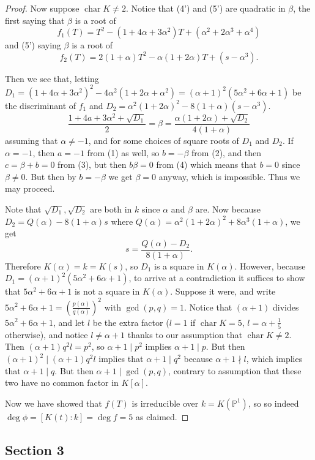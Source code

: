\documentclass{article}
\newcommand{\topic}[1]{%
  \phantomsection
  \subsection*{#1}%
  \addcontentsline{toc}{subsection}{#1}%
}
\theoremstyle{customplain}
\theoremstyle{customdef}
\renewcommand{\P}{\mathbb{P}}
\DeclareMathOperator{\Char}{\mathrm{char}}
\theoremstyle{definition} %
\begin{document}
\begin{proof}
Now suppose $\Char K \ne 2.$ Notice that (4') and (5') are quadratic in $\beta$, the first saying that $\beta$ is a root of
\[
f_1(T) = T^2-(1+4\alpha+3\alpha^2)T+(\alpha^2+2\alpha^3+\alpha^4)
\]
and (5') saying $\beta$ is a root of
\[
f_2(T) = 2(1+\alpha)T^2-\alpha(1+2\alpha)T+(s-\alpha^3).
\]

Then we see that, letting $D_1 = (1+4\alpha+3\alpha^2)^2-4\alpha^2(1+2\alpha+\alpha^2)=(\alpha+1)^2 \left( 5\alpha^2+6\alpha+1\right)$ be the discriminant of $f_1$ and $D_2 = \alpha^2(1+2\alpha)^2-8(1+\alpha)(s-\alpha^3)$.
\[
 \frac{1+4a+3\alpha^2 + \sqrt{D_1}}{2} = \beta =  \frac{\alpha(1+2\alpha) + \sqrt{D_2 }}{4(1+\alpha)}
\]
assuming that $\alpha \ne -1$, and for some choices of square roots of $D_1$ and $D_2$. If $\alpha =-1$, then $a=-1$ from (1) as well, so $b=-\beta$ from (2), and then $c=\beta+b = 0$ from (3), but then $b\beta = 0$ from (4) which means that $b=0$ since $\beta \ne 0.$ But then by $b=-\beta$ we get $\beta = 0$ anyway, which is impossible. Thus we may proceed.

Note that $\sqrt{D_1}, \sqrt{D_2}$ are both in $k$ since $\alpha$ and $\beta$ are. Now because $D_2 = Q(\alpha)-8(1+\alpha)s$ where $Q(\alpha)=\alpha^2(1+2\alpha)^2+8\alpha^3(1+\alpha)$, we get
\[
s=\frac{Q(\alpha)-D_2}{8(1+\alpha)}.
\]
Therefore $K(\alpha)=k=K(s)$, so $D_1 $ is a square in $K(\alpha)$. However, because $D_1 = (\alpha+1)^2(5\alpha^2+6\alpha+1)$, to arrive at a contradiction it suffices to show that $5\alpha^2+6\alpha+1$ is not a square in $K(\alpha).$ Suppose it were, and write $5\alpha^2+6\alpha+1=(\frac{p(\alpha)}{q(\alpha)})^2$ with $\gcd(p,q)=1$. Notice that $(\alpha+1)$ divides $5\alpha^2+6\alpha+1$, and let $l$ be the extra factor ($l=1$ if $\Char K = 5$, $l=\alpha+\frac{1}{5}$ otherwise), and notice $l\ne \alpha+1$ thanks to our assumption that $\Char K\ne 2$. Then $(\alpha+1)q^2 l = p^2$, so $\alpha+1 \mid p^2$ implies $\alpha+1 \mid p$. But then $(\alpha+1)^2\mid (\alpha+1)q^2 l$ implies that $\alpha+1 \mid q^2$ because $\alpha+1 \nmid l$, which implies that $\alpha+1\mid q$. But then $\alpha+1\mid \gcd(p,q)$, contrary to assumption that these two have no common factor in $K[\alpha].$

Now we have showed that $f(T)$ is irreducible over $k=K(\P^1)$, so so indeed $\deg \phi = [K(t):k] = \deg f = 5$ as claimed.

\end{proof}

\topic{Section 3}
\end{document}
